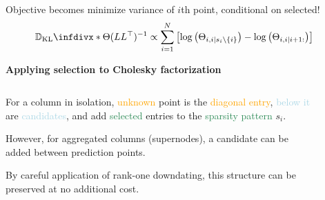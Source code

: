\documentclass{beamer}                             %
\newcommand{\blocktitle}[1]{{\Large \textbf{#1}}}
\newcommand*{\CM}{\Theta}
\newcommand*{\KL}{\mathbb{D}_{\operatorname{KL}}\infdivx}
\begin{document}
\begin{frame}[t]
\begin{columns}[T]
\begin{column}{0.30\textwidth}
\begin{tcolorbox}
    Objective becomes minimize variance of \(
    i \)th point, conditional on selected!
    \begin{align*}
      \KL*{\CM}{(L L^{\top})^{-1}} &\propto
      \sum_{i = 1}^N
        \left [
          \log \left ( \CM_{i, i \mid s_i \setminus \{ i \}} \right ) -
          \log \left ( \CM_{i, i \mid i + 1:} \right )
        \right ]
    \end{align*}
  \end{tcolorbox}

  \begin{tcolorbox}
    \blocktitle{Applying selection to Cholesky factorization}
    \vspace{-0.5\baselineskip}

    \begin{columns}
      \hfill
      \begin{column}{0.5\textwidth}
        For a column in isolation, \textcolor{orange}{unknown}
        point is the \textcolor{orange}{diagonal entry},
        \textcolor{lightblue}{below it} are \textcolor{lightblue}{candidates},
        and add \textcolor{seagreen}{selected} entries to the
        \textcolor{seagreen}{sparsity pattern} \( s_i \).

        \vspace{\baselineskip}
        However, for aggregated columns (supernodes), a
        candidate can be added between prediction points.

        By careful application of rank-one downdating, this
        structure can be preserved at no additional cost.
      \end{column}
      \begin{column}{0.5\textwidth}
        \vspace{-\baselineskip}
        \begin{figure}[t]
          \centering
        \end{figure}
      \end{column}
    \end{columns}
  \end{tcolorbox}
\end{column}


\end{columns}
\end{frame}
\end{document}
